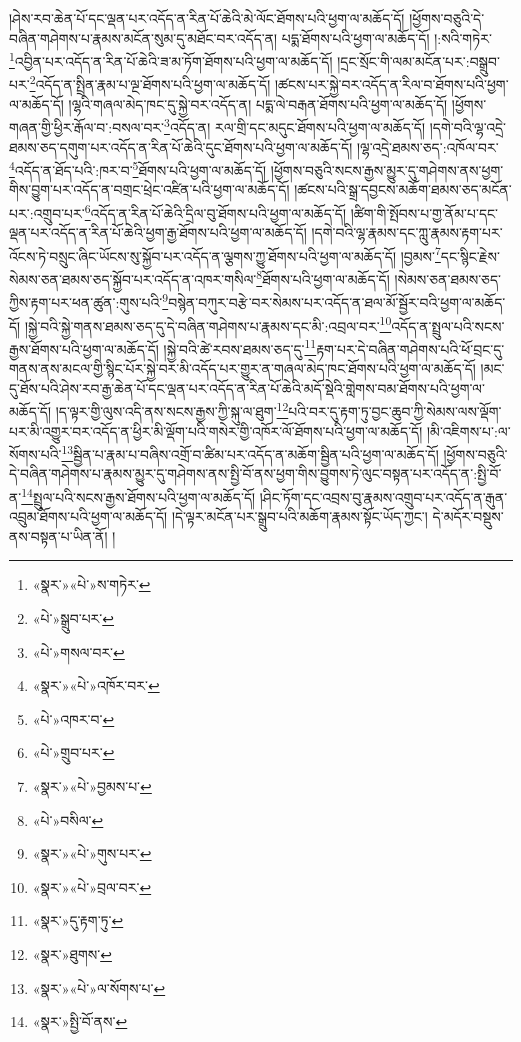 །ཤེས་རབ་ཆེན་པོ་དང་ལྡན་པར་འདོད་ན་རིན་པོ་ཆེའི་མེ་ལོང་ཐོགས་པའི་ཕྱག་ལ་མཆོད་དོ། །ཕྱོགས་བཅུའི་དེ་བཞིན་གཤེགས་པ་རྣམས་མངོན་སུམ་དུ་མཐོང་བར་འདོད་ན། པདྨ་ཐོགས་པའི་ཕྱག་ལ་མཆོད་དོ། །:སའི་གཏེར་\footnote{«སྣར་»«པེ་»ས་གཏེར་}འབྱིན་པར་འདོད་ན་རིན་པོ་ཆེའི་ཟ་མ་ཏོག་ཐོགས་པའི་ཕྱག་ལ་མཆོད་དོ། །དྲང་སྲོང་གི་ལམ་མངོན་པར་:བསྒྲུབ་པར་\footnote{«པེ་»སྒྲུབ་པར་}འདོད་ན་སྤྲིན་རྣམ་པ་ལྔ་ཐོགས་པའི་ཕྱག་ལ་མཆོད་དོ། །ཚངས་པར་སྐྱེ་བར་འདོད་ན་རིལ་བ་ཐོགས་པའི་ཕྱག་ལ་མཆོད་དོ། །ལྷའི་གཞལ་མེད་ཁང་དུ་སྐྱེ་བར་འདོད་ན། པདྨ་ལེ་བརྒན་ཐོགས་པའི་ཕྱག་ལ་མཆོད་དོ། །ཕྱོགས་གཞན་གྱི་ཕྱིར་རྒོལ་བ་:བསལ་བར་\footnote{«པེ་»གསལ་བར་}འདོད་ན། རལ་གྲི་དང་མདུང་ཐོགས་པའི་ཕྱག་ལ་མཆོད་དོ། །དགེ་བའི་ལྷ་འདྲེ་ཐམས་ཅད་དགུག་པར་འདོད་ན་རིན་པོ་ཆེའི་དུང་ཐོགས་པའི་ཕྱག་ལ་མཆོད་དོ། །ལྷ་འདྲེ་ཐམས་ཅད་:འཁོལ་བར་\footnote{«སྣར་»«པེ་»འཁོར་བར་}འདོད་ན་ཐོད་པའི་:ཁར་བ་\footnote{«པེ་»འཁར་བ་}ཐོགས་པའི་ཕྱག་ལ་མཆོད་དོ། །ཕྱོགས་བཅུའི་སངས་རྒྱས་མྱུར་དུ་གཤེགས་ནས་ཕྱག་གིས་བྱུག་པར་འདོད་ན་བགྲང་ཕྲེང་འཛིན་པའི་ཕྱག་ལ་མཆོད་དོ། །ཚངས་པའི་སྒྲ་དབྱངས་མཆོག་ཐམས་ཅད་མངོན་པར་:འགྲུབ་པར་\footnote{«པེ་»གྲུབ་པར་}འདོད་ན་རིན་པོ་ཆེའི་དྲིལ་བུ་ཐོགས་པའི་ཕྱག་ལ་མཆོད་དོ། །ཚིག་གི་སྤོབས་པ་གྱ་ནོམ་པ་དང་ལྡན་པར་འདོད་ན་རིན་པོ་ཆེའི་ཕྱག་རྒྱ་ཐོགས་པའི་ཕྱག་ལ་མཆོད་དོ། །དགེ་བའི་ལྷ་རྣམས་དང་ཀླུ་རྣམས་རྟག་པར་འོངས་ཏེ་བསྲུང་ཞིང་ཡོངས་སུ་སྐྱོབ་པར་འདོད་ན་ལྕགས་ཀྱུ་ཐོགས་པའི་ཕྱག་ལ་མཆོད་དོ། །བྱམས་\footnote{«སྣར་»«པེ་»བྱམས་པ་}དང་སྙིང་རྗེས་སེམས་ཅན་ཐམས་ཅད་སྐྱོབ་པར་འདོད་ན་འཁར་གསིལ་\footnote{«པེ་»བསིལ་}ཐོགས་པའི་ཕྱག་ལ་མཆོད་དོ། །སེམས་ཅན་ཐམས་ཅད་ཀྱིས་རྟག་པར་ཕན་ཚུན་:གུས་པའི་\footnote{«སྣར་»«པེ་»གུས་པར་}བསྙེན་བཀུར་བརྩེ་བར་སེམས་པར་འདོད་ན་ཐལ་མོ་སྦྱོར་བའི་ཕྱག་ལ་མཆོད་དོ། །སྐྱེ་བའི་སྐྱེ་གནས་ཐམས་ཅད་དུ་དེ་བཞིན་གཤེགས་པ་རྣམས་དང་མི་:འབྲལ་བར་\footnote{«སྣར་»«པེ་»བྲལ་བར་}འདོད་ན་སྤྲུལ་པའི་སངས་རྒྱས་ཐོགས་པའི་ཕྱག་ལ་མཆོད་དོ། །སྐྱེ་བའི་ཚེ་རབས་ཐམས་ཅད་དུ་\footnote{«སྣར་»དུ་རྟག་ཏུ་}རྟག་པར་དེ་བཞིན་གཤེགས་པའི་ཕོ་བྲང་དུ་གནས་ནས་མངལ་གྱི་སྙིང་པོར་སྐྱེ་བར་མི་འདོད་པར་གྱུར་ན་གཞལ་མེད་ཁང་ཐོགས་པའི་ཕྱག་ལ་མཆོད་དོ། །མང་དུ་ཐོས་པའི་ཤེས་རབ་རྒྱ་ཆེན་པོ་དང་ལྡན་པར་འདོད་ན་རིན་པོ་ཆེའི་མདོ་སྡེའི་གླེགས་བམ་ཐོགས་པའི་ཕྱག་ལ་མཆོད་དོ། །ད་ལྟར་གྱི་ལུས་འདི་ནས་སངས་རྒྱས་ཀྱི་སྐུ་ལ་ཐུག་\footnote{«སྣར་»ཐུགས་}པའི་བར་དུ་རྟག་ཏུ་བྱང་ཆུབ་ཀྱི་སེམས་ལས་ལྡོག་པར་མི་འགྱུར་བར་འདོད་ན་ཕྱིར་མི་ལྡོག་པའི་གསེར་གྱི་འཁོར་ལོ་ཐོགས་པའི་ཕྱག་ལ་མཆོད་དོ། །མི་འཇིགས་པ་:ལ་སོགས་པའི་\footnote{«སྣར་»«པེ་»ལ་སོགས་པ་}སྦྱིན་པ་རྣམ་པ་བཞིས་འགྲོ་བ་ཚིམ་པར་འདོད་ན་མཆོག་སྦྱིན་པའི་ཕྱག་ལ་མཆོད་དོ། །ཕྱོགས་བཅུའི་དེ་བཞིན་གཤེགས་པ་རྣམས་མྱུར་དུ་གཤེགས་ནས་སྤྱི་བོ་ནས་ཕྱག་གིས་བྱུགས་ཏེ་ལུང་བསྟན་པར་འདོད་ན་:སྤྱི་བོ་ན་\footnote{«སྣར་»སྤྱི་བོ་ནས་}སྤྲུལ་པའི་སངས་རྒྱས་ཐོགས་པའི་ཕྱག་ལ་མཆོད་དོ། །ཤིང་ཏོག་དང་འབྲས་བུ་རྣམས་འགྲུབ་པར་འདོད་ན་རྒུན་འབྲུམ་ཐོགས་པའི་ཕྱག་ལ་མཆོད་དོ། །དེ་ལྟར་མངོན་པར་སྒྲུབ་པའི་མཆོག་རྣམས་སྟོང་ཡོད་ཀྱང་། དེ་མདོར་བསྡུས་ནས་བསྟན་པ་ཡིན་ནོ། །
